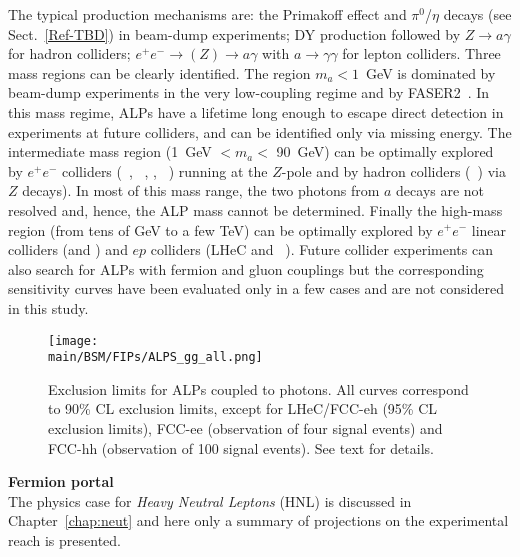 \documentclass[../report.tex]{subfiles}
\providecommand{\main}{..}
\begin{document}
The typical production mechanisms are: the Primakoff effect and $\pi^0$/$\eta$ decays (see Sect.~\ref{Ref-TBD}) in beam-dump experiments; DY production followed by $Z \to a \gamma$ for hadron colliders; $e^+ e^-  \to (Z) \to a \gamma$ with $a \to \gamma \gamma$ for lepton colliders.
Three mass regions can be clearly identified. The region $m_a < 1$~GeV is dominated by beam-dump experiments in the very low-coupling regime and by FASER2~\cite{Ariga:2018pin}. In this mass regime, ALPs have a lifetime long enough to escape direct detection in experiments at future colliders, and can be identified only via missing energy.
The intermediate mass region (1~GeV $< m_a < $ 90~GeV) can be optimally explored by $e^+ e^-$ colliders (\CEPC~\cite{CEPCStudyGroup:2018ghi}, \CLIC~\cite{deBlas:2019rxi}, \ILC, 
\FCCee~\cite{Bauer:2018uxu}) running at the $Z$-pole and by hadron colliders (\FCChh~\cite{Bauer:2018uxu}) via $Z$ decays). In most of this mass range, the two photons from $a$ decays are not resolved and, hence, the ALP mass cannot be determined. Finally the high-mass region (from tens of GeV to a few TeV) can be optimally explored  by $e^+ e^-$ linear colliders (\ILC and \CLIC) and $ep$ colliders (LHeC and \FCCeh~\cite{Yue:2019gbh}).
Future collider experiments can also search for ALPs with fermion and gluon couplings but the corresponding sensitivity curves have been evaluated only in a few cases and are not considered in this study. 

\begin{figure}[htb]
    \centering
    \texttt{[image: \\main/BSM/FIPs/ALPS\_gg\_all.png]}
    \caption{Exclusion limits for ALPs coupled to photons. All curves correspond to 90\% CL exclusion limits, except for LHeC/FCC-eh (95\% CL exclusion limits), FCC-ee (observation of four signal events) and FCC-hh (observation of 100 signal events). See text for details.}
    \label{fig:FIPs-ALP}
\end{figure}

\vskip 2mm
\noindent
{\bf Fermion portal} \\
The physics case for {\it Heavy Neutral Leptons} (HNL) is discussed in Chapter~\ref{chap:neut} and here only a summary of projections on the experimental reach is presented.
\end{document}
